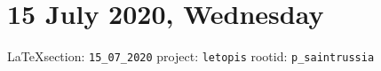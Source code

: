  
 
\section{15 July 2020, Wednesday}

\vspace{0.5cm}
{\small\LaTeX section: \verb|15_07_2020| project: \verb|letopis| rootid: \verb|p_saintrussia|}
\vspace{0.5cm}



  

